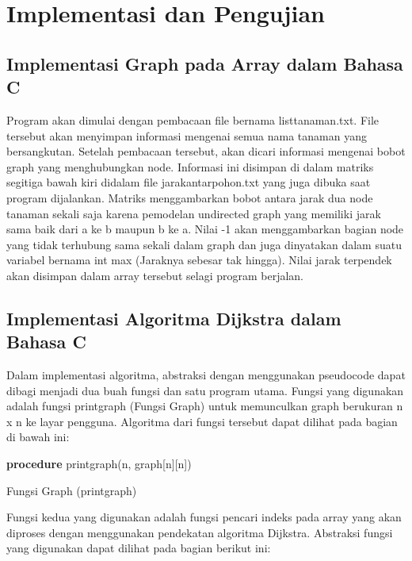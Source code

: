 \documentclass[conference]{IEEEtran}
\begin{document}
\section{Implementasi dan Pengujian}
\subsection{Implementasi Graph pada Array dalam Bahasa C}
Program akan dimulai dengan pembacaan file bernama listtanaman.txt. File tersebut akan menyimpan informasi mengenai semua nama tanaman yang bersangkutan. Setelah pembacaan tersebut, akan dicari informasi mengenai bobot graph yang menghubungkan node. Informasi ini disimpan di dalam matriks segitiga bawah kiri didalam file jarakantarpohon.txt yang juga dibuka saat program dijalankan. Matriks menggambarkan bobot antara jarak dua node tanaman sekali saja karena pemodelan undirected graph yang memiliki jarak sama baik dari a ke b maupun b ke a. Nilai -1 akan menggambarkan bagian node yang tidak terhubung sama sekali dalam graph dan juga dinyatakan dalam suatu variabel bernama int max (Jaraknya sebesar tak hingga). Nilai jarak terpendek akan
disimpan dalam array tersebut selagi program berjalan.

\subsection{Implementasi Algoritma Dijkstra dalam Bahasa C}
Dalam implementasi algoritma, abstraksi dengan menggunakan pseudocode dapat dibagi menjadi dua buah fungsi dan satu program utama. Fungsi yang digunakan adalah fungsi printgraph (Fungsi Graph) untuk memunculkan graph berukuran n x n ke layar pengguna. Algoritma dari fungsi tersebut dapat dilihat pada bagian di bawah ini:

\begin{algorithm}
\DontPrintSemicolon
{}
{\bf procedure} printgraph(n, graph[n][n])\;
\caption{Fungsi Graph (printgraph)\label{IR}}
\end{algorithm}

Fungsi kedua yang digunakan adalah fungsi pencari indeks pada array yang akan diproses dengan menggunakan pendekatan algoritma Dijkstra. Abstraksi fungsi yang digunakan dapat dilihat pada bagian berikut ini:
\end{document}
